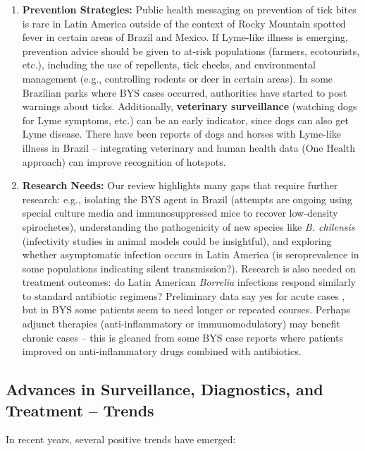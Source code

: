 \documentclass[11pt,letterpaper]{article}
\begin{document}
\begin{enumerate}
    \item \textbf{Prevention Strategies:} Public health messaging on prevention of tick bites is rare in Latin America outside of the context of Rocky Mountain spotted fever in certain areas of Brazil and Mexico. If Lyme-like illness is emerging, prevention advice should be given to at-risk populations (farmers, ecotourists, etc.), including the use of repellents, tick checks, and environmental management (e.g., controlling rodents or deer in certain areas). In some Brazilian parks where BYS cases occurred, authorities have started to post warnings about ticks. Additionally, \textbf{veterinary surveillance} (watching dogs for Lyme symptoms, etc.) can be an early indicator, since dogs can also get Lyme disease. There have been reports of dogs and horses with Lyme-like illness in Brazil \citep{Jorge2023e, Jorge2023f} – integrating veterinary and human health data (One Health approach) can improve recognition of hotspots.

    \item \textbf{Research Needs:} Our review highlights many gaps that require further research: e.g., isolating the BYS agent in Brazil (attempts are ongoing using special culture media and immunosuppressed mice to recover low-density spirochetes), understanding the pathogenicity of new species like \textit{B. chilensis} (infectivity studies in animal models could be insightful), and exploring whether asymptomatic infection occurs in Latin America (is seroprevalence in some populations indicating silent transmission?). Research is also needed on treatment outcomes: do Latin American \textit{Borrelia} infections respond similarly to standard antibiotic regimens? Preliminary data say yes for acute cases \citep{Yoshinari2022ag}, but in BYS some patients seem to need longer or repeated courses. Perhaps adjunct therapies (anti-inflammatory or immunomodulatory) may benefit chronic cases – this is gleaned from some BYS case reports where patients improved on anti-inflammatory drugs combined with antibiotics.
\end{enumerate}

\subsection{Advances in Surveillance, Diagnostics, and Treatment – Trends}
In recent years, several positive trends have emerged:
\end{document}
